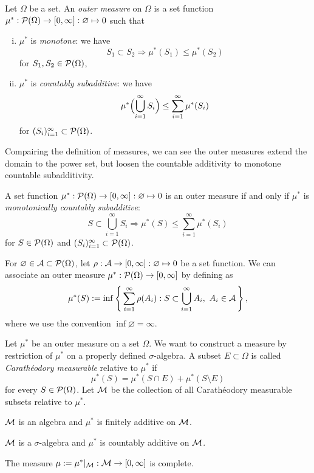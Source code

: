 \documentclass{../note}
\begin{document}
\begin{prb}
Let $\Omega$ be a set.
An \emph{outer measure} on $\Omega$ is a set function $\mu^*:\mathcal{P}(\Omega)\to[0,\infty]:\varnothing\mapsto0$ such that
\begin{enumerate}[(i)]
\item $\mu^*$ is \emph{monotone}: we have
\[S_1\subset S_2\Rightarrow\mu^*(S_1)\le\mu^*(S_2)\]
for $S_1,S_2\in\mathcal{P}(\Omega)$,
\item $\mu^*$ is \emph{countably subadditive}: we have
\[\mu^*\Bigl(\bigcup_{i=1}^\infty S_i\Bigr)\le\sum_{i=1}^\infty\mu^*(S_i)\]
for $(S_i)_{i=1}^\infty\subset\mathcal{P}(\Omega)$.
\end{enumerate}
Compairing the definition of measures, we can see the outer measures extend the domain to the power set, but loosen the countable additivity to monotone countable subadditivity.
\begin{parts}
\item A set function $\mu^*:\mathcal{P}(\Omega)\to[0,\infty]:\varnothing\mapsto0$ is an outer measure if and only if $\mu^*$ is \emph{monotonically countably subadditive}:
\[S\subset\bigcup_{i=1}^\infty S_i\Rightarrow\mu^*(S)\le\sum_{i=1}^\infty\mu^*(S_i)\]
for $S\in\mathcal{P}(\Omega)$ and $(S_i)_{i=1}^\infty\subset\mathcal{P}(\Omega)$.
\item
For $\varnothing\in\mathcal{A}\subset\mathcal{P}(\Omega)$, let $\rho:\mathcal{A}\to[0,\infty]:\varnothing\mapsto0$ be a set function.
We can associate an outer measure $\mu^*:\mathcal{P}(\Omega)\to[0,\infty]$ by defining as
\[\mu^*(S):=\inf\left\{\,\sum_{i=1}^\infty\rho(A_i):S\subset\bigcup_{i=1}^\infty A_i,\ A_i\in\mathcal{A}\,\right\},\]
where we use the convention $\inf\varnothing=\infty$.
\end{parts}
\end{prb}
\begin{pf}

\end{pf}

\begin{prb}
Let $\mu^*$ be an outer measure on a set $\Omega$.
We want to construct a measure by restriction of $\mu^*$ on a properly defined $\sigma$-algebra.
A subset $E\subset\Omega$ is called \emph{Carath\'eodory measurable} relative to $\mu^*$ if
\[\mu^*(S)=\mu^*(S\cap E)+\mu^*(S\setminus E)\]
for every $S\in\mathcal{P}(\Omega)$.
Let $\mathcal{M}$ be the collection of all Carath\'eodory measurable subsets relative to $\mu^*$.
\begin{parts}
\item $\mathcal{M}$ is an algebra and $\mu^*$ is finitely additive on $\mathcal{M}$.
\item $\mathcal{M}$ is a $\sigma$-algebra and $\mu^*$ is countably additive on $\mathcal{M}$.
\item The measure $\mu:=\mu^*|_{\mathcal{M}}:\mathcal{M}\to[0,\infty]$ is complete.
\end{parts}
\end{prb}
\begin{pf}

\end{pf}
\end{document}
